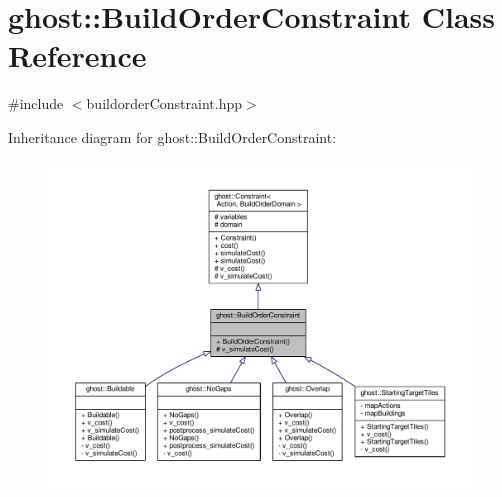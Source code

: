 \hypertarget{classghost_1_1BuildOrderConstraint}{\section{ghost\-:\-:Build\-Order\-Constraint Class Reference}
\label{classghost_1_1BuildOrderConstraint}
}


{\ttfamily \#include $<$buildorder\-Constraint.\-hpp$>$}



Inheritance diagram for ghost\-:\-:Build\-Order\-Constraint\-:
\nopagebreak
\begin{figure}[H]
\begin{center}
\leavevmode
\includegraphics[width=350pt]{classghost_1_1BuildOrderConstraint__inherit__graph}
\end{center}
\end{figure}


